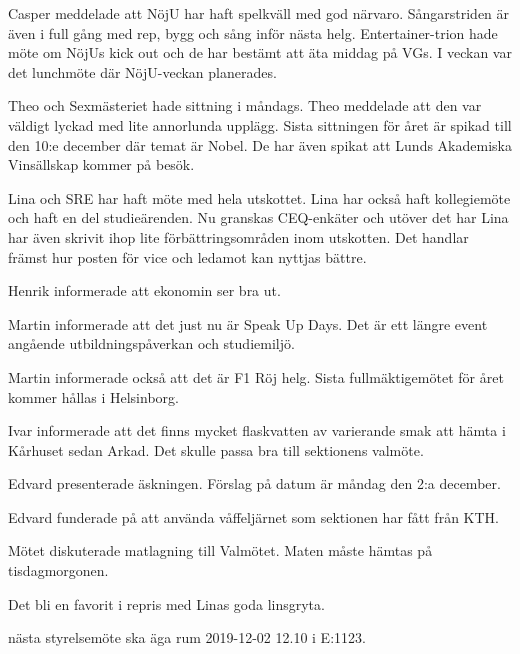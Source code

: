 \documentclass[10pt]{article}
\begin{document}
\begin{paragrafer}
\begin{paragrafer}
Casper meddelade att NöjU har haft spelkväll med god närvaro. Sångarstriden är även i full gång med rep, bygg och sång inför nästa helg. 
Entertainer-trion hade möte om NöjUs kick out och de har bestämt att äta middag på VGs. I veckan var det lunchmöte där NöjU-veckan planerades.

Theo och Sexmästeriet hade sittning i måndags. Theo meddelade att den var väldigt lyckad med lite annorlunda upplägg. Sista sittningen för året är spikad till den 10:e december där temat är Nobel. De har även spikat att Lunds Akademiska Vinsällskap kommer på besök. 

Lina och SRE har haft möte med hela utskottet. Lina har också haft kollegiemöte och haft en del studieärenden. Nu granskas CEQ-enkäter och utöver det har Lina har även skrivit ihop lite förbättringsområden inom utskotten. Det handlar främst hur posten för vice och ledamot kan nyttjas bättre.  

 
Henrik informerade att ekonomin ser bra ut.


Martin informerade att det just nu är Speak Up Days. Det är ett längre event angående utbildningspåverkan och studiemiljö. 

Martin informerade också att det är F1 Röj helg. Sista fullmäktigemötet för året kommer hållas i Helsinborg. 

Ivar informerade att det finns mycket flaskvatten av varierande smak att hämta i Kårhuset sedan Arkad. Det skulle passa bra till sektionens valmöte. 

\end{paragrafer}

Edvard presenterade äskningen. Förslag på datum är måndag den 2:a december. 

Edvard funderade på att använda våffeljärnet som sektionen har fått från KTH. 

\Mbabay


Mötet diskuterade matlagning till Valmötet. Maten måste hämtas på tisdagmorgonen. 

Det bli en favorit i repris med Linas goda linsgryta. 

\Mba nästa styrelsemöte ska äga rum 2019-12-02 12.10 i E:1123.


\end{paragrafer}
\end{document}
